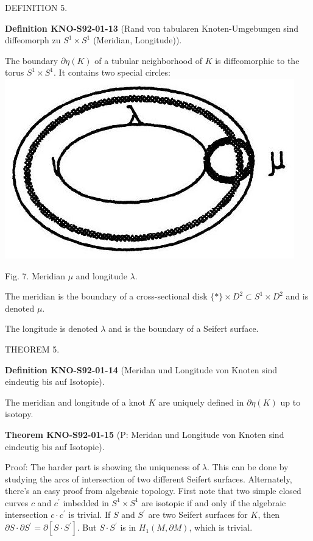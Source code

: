 \documentclass[10pt, letterpaper]{article}
\newcommand{\CustomHeading}[3]{%
  \par\medskip\noindent%
  \textbf{#1 #2} \textnormal{(#3)}.\enskip%
}
\newenvironment{DEF}[2]{\begin{unitbox}\CustomHeading{Definition}{#1}{#2}}{\end{unitbox}}
\newenvironment{THEO}[2]{\begin{unitbox}\CustomHeading{Theorem}{#1}{#2}}{\end{unitbox}}
\begin{document}
DEFINITION 5. 

\begin{DEF}{KNO-S92-01-13}{Rand von tabularen Knoten-Umgebungen sind diffeomorph zu $S^1\times S^1$ (Meridian, Longitude)}
The boundary $\partial \eta(K)$ of a tubular neighborhood of $K$ is diffeomorphic to the torus $S^{1} \times S^{1}$. It contains two special circles:\\
\includegraphics[scale=0.2, center]{2025_05_21_037de704f595ce642d3eg-080}

Fig. 7. Meridian $\mu$ and longitude $\lambda$.

The meridian is the boundary of a cross-sectional disk $\{*\} \times D^{2} \subset S^{1} \times D^{2}$ and is denoted $\mu$.

The longitude is denoted $\lambda$ and is the boundary of a Seifert surface.
\end{DEF}


THEOREM 5. 

\begin{DEF}{KNO-S92-01-14}{Meridan und Longitude von Knoten sind eindeutig bis auf Isotopie}
The meridian and longitude of a knot $K$ are uniquely defined in $\partial \eta(K)$ up to isotopy.
\end{DEF}

\begin{THEO}{KNO-S92-01-15}{P: Meridan und Longitude von Knoten sind eindeutig bis auf Isotopie}
Proof: The harder part is showing the uniqueness of $\lambda$. This can be done by studying the arcs of intersection of two different Seifert surfaces. Alternately, there's an easy proof from algebraic topology. First note that two simple closed curves $c$ and $c^{\prime}$ imbedded in $S^{1} \times S^{1}$ are isotopic if and only if the algebraic intersection $c \cdot c^{\prime}$ is trivial. If $S$ and $S^{\prime}$ are two Seifert surfaces for $K$, then $\partial S \cdot \partial S^{\prime}=\partial\left[S \cdot S^{\prime}\right]$. But $S \cdot S^{\prime}$ is in $H_{1}(M, \partial M)$, which is trivial.
\end{THEO}
\end{document}
